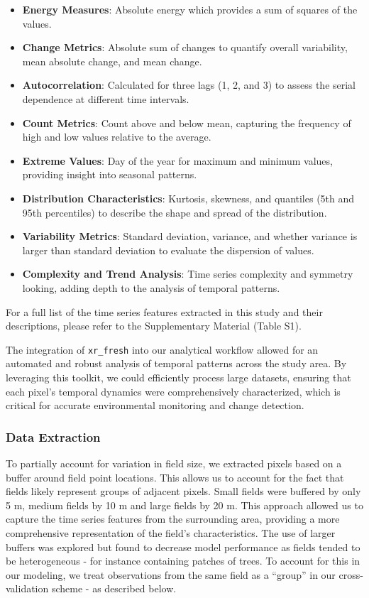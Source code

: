 \documentclass[
  journal,
  twocolumn]{IEEEtran}
\providecommand{\tightlist}{%
  \setlength{\itemsep}{0pt}\setlength{\parskip}{0pt}}
\begin{document}
\begin{itemize}
\tightlist
\item
  \textbf{Energy Measures}: Absolute energy which provides a sum of
  squares of the values.
\item
  \textbf{Change Metrics}: Absolute sum of changes to quantify overall
  variability, mean absolute change, and mean change.
\item
  \textbf{Autocorrelation}: Calculated for three lags (1, 2, and 3) to
  assess the serial dependence at different time intervals.
\item
  \textbf{Count Metrics}: Count above and below mean, capturing the
  frequency of high and low values relative to the average.
\item
  \textbf{Extreme Values}: Day of the year for maximum and minimum
  values, providing insight into seasonal patterns.
\item
  \textbf{Distribution Characteristics}: Kurtosis, skewness, and
  quantiles (5th and 95th percentiles) to describe the shape and spread
  of the distribution.
\item
  \textbf{Variability Metrics}: Standard deviation, variance, and
  whether variance is larger than standard deviation to evaluate the
  dispersion of values.
\item
  \textbf{Complexity and Trend Analysis}: Time series complexity and
  symmetry looking, adding depth to the analysis of temporal patterns.
\end{itemize}

For a full list of the time series features extracted in this study and
their descriptions, please refer to the Supplementary Material (Table
S1).

The integration of \texttt{xr\_fresh} into our analytical workflow
allowed for an automated and robust analysis of temporal patterns across
the study area. By leveraging this toolkit, we could efficiently process
large datasets, ensuring that each pixel's temporal dynamics were
comprehensively characterized, which is critical for accurate
environmental monitoring and change detection.

\hypertarget{data-extraction}{%
\subsubsection{Data Extraction}\label{data-extraction}}

To partially account for variation in field size, we extracted pixels
based on a buffer around field point locations. This allows us to
account for the fact that fields likely represent groups of adjacent
pixels. Small fields were buffered by only 5 m, medium fields by 10 m
and large fields by 20 m. This approach allowed us to capture the time
series features from the surrounding area, providing a more
comprehensive representation of the field's characteristics. The use of
larger buffers was explored but found to decrease model performance as
fields tended to be heterogeneous - for instance containing patches of
trees. To account for this in our modeling, we treat observations from
the same field as a ``group'' in our cross-validation scheme - as
described below.
\end{document}
